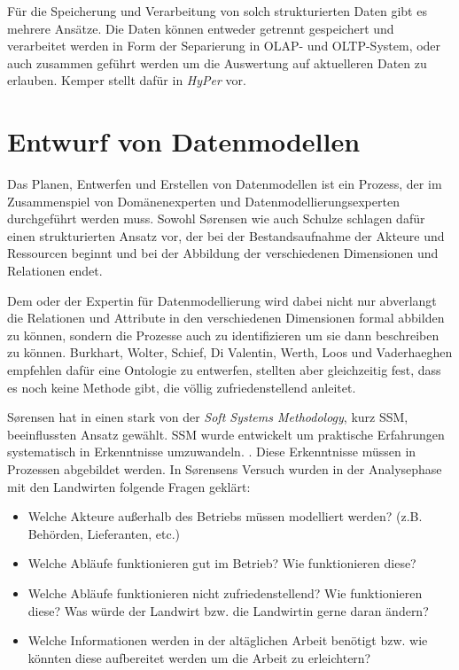 Für die Speicherung und Verarbeitung von solch strukturierten Daten gibt es mehrere Ansätze. Die Daten können entweder getrennt gespeichert und verarbeitet werden in Form der Separierung in OLAP- und OLTP-System, oder auch zusammen geführt werden um die Auswertung auf aktuelleren Daten zu erlauben. Kemper stellt dafür in \cite{jour:Kemper2011} \textit{HyPer} vor.

\section{Entwurf von Datenmodellen}
Das Planen, Entwerfen und Erstellen von Datenmodellen ist ein Prozess, der im Zusammenspiel von Domänenexperten und Datenmodellierungsexperten durchgeführt werden muss. Sowohl S\o rensen wie auch Schulze schlagen dafür einen strukturierten Ansatz vor, der bei der Bestandsaufnahme der Akteure und Ressourcen beginnt und bei der Abbildung der verschiedenen Dimensionen und Relationen endet.\cite{jour:Schulze2007}\cite{jour:Sorensen2010}

Dem oder der Expertin für Datenmodellierung wird dabei nicht nur abverlangt die Relationen und Attribute in den verschiedenen Dimensionen formal abbilden zu können, sondern die Prozesse auch zu identifizieren um sie dann beschreiben zu können. Burkhart, Wolter, Schief, Di Valentin, Werth, Loos und Vaderhaeghen empfehlen dafür eine Ontologie zu entwerfen, stellten aber gleichzeitig fest, dass es noch keine Methode gibt, die völlig zufriedenstellend anleitet.\cite{jour:Burkhart2012} 

S\o rensen hat in \cite{jour:Sorensen2010} einen stark von der \textit{Soft Systems Methodology}, kurz SSM, beeinflussten Ansatz gewählt. SSM wurde entwickelt um praktische Erfahrungen systematisch in Erkenntnisse umzuwandeln. \cite{jour:Checkland2000}. Diese Erkenntnisse müssen in Prozessen abgebildet werden. In S\o rensens Versuch wurden in der Analysephase mit den Landwirten folgende Fragen geklärt:
\begin{itemize}
 \item Welche Akteure außerhalb des Betriebs müssen modelliert werden? (z.B. Behörden, Lieferanten, etc.)
 \item Welche Abläufe funktionieren gut im Betrieb? Wie funktionieren diese?
 \item Welche Abläufe funktionieren nicht zufriedenstellend? Wie funktionieren diese? Was würde der Landwirt bzw. die Landwirtin gerne daran ändern?
 \item Welche Informationen werden in der altäglichen Arbeit benötigt bzw. wie könnten diese aufbereitet werden um die Arbeit zu erleichtern?
\end{itemize}

